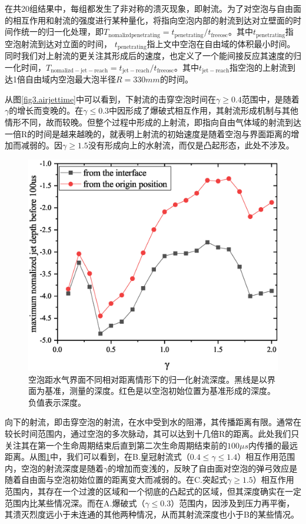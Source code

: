 在共20组结果中，每组都发生了非对称的溃灭现象，即射流。为了对空泡与自由面的相互作用和射流的强度进行某种量化，将指向空泡内部的射流到达对立壁面的时间作统一的归一化处理，即$T_\mathrm{nomalizd penetrating}=t_\mathrm{penetrating}/t_\mathrm{freeosc}$。其中$t_\mathrm{penetrating}$指空泡射流到达对立面的时间， $t_\mathrm{penetrating}$指上文中空泡在自由域的体积最小时间。同时我们对上射流的更关注其形成后的速度，也定义了一个能间接反应其速度的归一化时间，$T_\mathrm{nomalizd-jet-reach}=t_\mathrm{jet-reach}/t_\mathrm{freeosc}$。其中$t_\mathrm{jet-reach}$指空泡的上射流到达1倍自由域内空泡最大泡半径$R=330mm $的时间。

从图\ref{fig3.airjettime}中可以看到，下射流的击穿空泡时间在$\gamma \geq 0.4$范围中，是随着$\gamma $的增长而变晚的。在$\gamma \leq 0.3$中因形成了爆破式相互作用，其射流形成机制与其他情形不同，故而较晚。但整个过程中形成的上射流，即指向自由气体域的射流到达一倍R的时间是越来越晚的，就表明上射流的初始速度是随着空泡与界面距离的增加而减弱的。因$\gamma \geq 1.5$没有形成向上的水射流，而仅是凸起形态，此处不涉及。


\begin{figure}[h]
    \centering
    \includegraphics[width=0.6\linewidth]{img/fig3.airdistance.eps}
    \caption[空泡距水气界面不同相对距离情形下的归一化射流深度]{空泡距水气界面不同相对距离情形下的归一化射流深度。黑线是以界面为基准，测量的深度。红色是以空泡初始位置为基准形成的深度。负值表示深度。}
    \label{fig3.airdistance}
\end{figure}

向下的射流，即击穿空泡的射流，在水中受到水的阻滞，其传播距离有限。通常在较长时间范围内，通过空泡的多次脉动，其可以达到十几倍R的距离。此处我们只关注其在第一个生命周期结束后直到第二次生命周期结束前的$100\mu s $内传播的最远距离。从图\ref{fig3.airdistance}中，我们可以看到，在B.皇冠射流式（$0.4\leq\gamma\leq 1.4$）相互作用范围内，空泡的射流深度是随着$\gamma $的增加而变浅的，反映了自由面对空泡的弹弓效应是随着自由面与空泡初始位置的距离变大而减弱的。在C.突起式$\gamma\geq 1.5$）相互作用范围内，其存在一个过渡的区域和一个彻底的凸起式的区域，但其深度确实在一定范围内比某些情况深。而在A.爆破式（$\gamma\leq 0.3$）范围内，因涉及到压力再平衡，其溃灭烈度远小于未连通的其他两种情况，从而其射流深度也小于B的某些情况。









